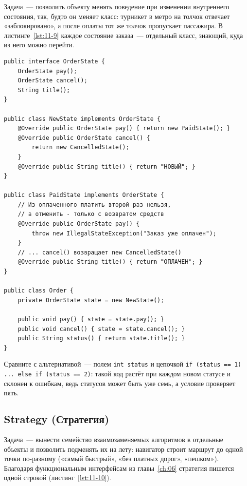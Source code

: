 Задача~--- позволить объекту менять поведение при изменении внутреннего
состояния, так, будто он меняет класс: турникет в метро на толчок отвечает
«заблокировано», а после оплаты тот же толчок пропускает пассажира. В
листинге~\ref{lst:11-9} каждое состояние заказа~--- отдельный класс, знающий,
куда из него можно перейти.

\begin{listing}[H]
\begin{verbatim}
public interface OrderState {
    OrderState pay();
    OrderState cancel();
    String title();
}

public class NewState implements OrderState {
    @Override public OrderState pay() { return new PaidState(); }
    @Override public OrderState cancel() {
        return new CancelledState();
    }
    @Override public String title() { return "НОВЫЙ"; }
}

public class PaidState implements OrderState {
    // Из оплаченного платить второй раз нельзя,
    // а отменить - только с возвратом средств
    @Override public OrderState pay() {
        throw new IllegalStateException("Заказ уже оплачен");
    }
    // ... cancel() возвращает new CancelledState()
    @Override public String title() { return "ОПЛАЧЕН"; }
}

public class Order {
    private OrderState state = new NewState();

    public void pay() { state = state.pay(); }
    public void cancel() { state = state.cancel(); }
    public String status() { return state.title(); }
}
\end{verbatim}
\caption{Каждое состояние заказа - отдельный класс}
\label{lst:11-9}
\end{listing}

Сравните с альтернативой~--- полем \texttt{int status} и цепочкой
\texttt{if (status == 1) ... else if (status == 2)}: такой код растёт при каждом
новом статусе и склонен к ошибкам, ведь статусов может быть уже семь, а условие
проверяет пять.

\subsection{Strategy (Стратегия)}

Задача~--- вынести семейство взаимозаменяемых алгоритмов в отдельные объекты и
позволить подменять их на лету: навигатор строит маршрут до одной точки
по-разному («самый быстрый», «без платных дорог», «пешком»). Благодаря
функциональным интерфейсам из главы~\ref{ch:06} стратегия пишется одной строкой
(листинг~\ref{lst:11-10}).

